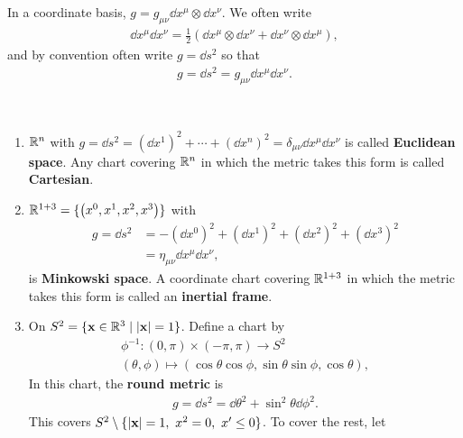 
In a coordinate basis, $g = g_{\mu \nu} \dd{x}^{\mu} \otimes \dd{x}^{\nu}$. We often write
\begin{align}
    \dd{x}^{\mu} \dd{x}^{\nu} = \frac{1}{2} \left( \dd{x}^{\mu} \otimes \dd{x}^{\nu} + \dd{x}^{\nu} \otimes \dd{x}^{\mu} \right) 
,\end{align}
and by convention often write $g = \dd{s}^2$ so that
\begin{align}
    g = \dd{s}^2 = g_{\mu \nu} \dd{x}^{\mu} \dd{x}^{\nu}
.\end{align}

\begin{examples}~
    \begin{enumerate}[label=\roman*)]
        \item $\mathbb{R}^{n}$ with $g = \dd{s}^2 = \left( \dd{x}^{1} \right)^2 + \cdots + \left( \dd{x}^{n} \right)^2 = \delta_{\mu \nu} \dd{x}^{\mu} \dd{x}^{\nu}$ is called \textbf{Euclidean space}. Any chart covering $\mathbb{R}^{n}$ in which the metric takes this form is called \textbf{Cartesian}.
        \item $\mathbb{R}^{1+3} = \{\left( x^{0}, x^{1}, x^{2}, x^{3} \right) \} $ with
            \begin{align}
                g = \dd{s}^2 &= - \left( \dd{x}^{0} \right)^2 + \left( \dd{x}^{1} \right)^2 + \left( \dd{x}^{2} \right)^2 + \left( \dd{x}^{3} \right)^2\\
                &= \eta_{\mu \nu} \dd{x}^{\mu} \dd{x}^{\nu}
            ,\end{align}
            is \textbf{Minkowski space}. A coordinate chart covering $\mathbb{R}^{1+3}$ in which the metric takes this form is called an \textbf{inertial frame}.
        \item On $S^{2} = \{\vb{x} \in \mathbb{R}^{3}  \mid  \left| \vb{x} \right| = 1\} $. Define a chart by
            \begin{align}
                \phi^{-1} : \left( 0, \pi \right) \times \left( -\pi, \pi \right) \to S^2 \\
                \left( \theta, \phi \right) \mapsto \left( \cos \theta \cos \phi, \sin \theta \sin \phi, \cos \theta \right) 
            ,\end{align}
            In this chart, the \textbf{round metric} is
            \begin{align}
                g = \dd{s}^2 = \dd{\theta}^2 + \sin^2 \theta \dd{\phi^2}
            .\end{align}
            This covers $S^2 \setminus \{\left| \vb{x} \right| = 1,~  x^2 = 0,~  x' \leq 0\} $. To cover the rest, let

\end{enumerate}
\end{examples}
